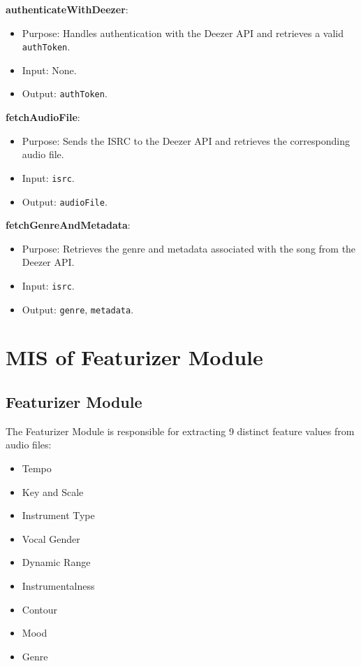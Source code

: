 \documentclass[12pt, titlepage]{article}
\begin{document}
\textbf{authenticateWithDeezer}:
\begin{itemize}
\item Purpose: Handles authentication with the Deezer API and retrieves a valid \texttt{authToken}.
\item Input: None.
\item Output: \texttt{authToken}.
\end{itemize}

\textbf{fetchAudioFile}:
\begin{itemize}
\item Purpose: Sends the ISRC to the Deezer API and retrieves the corresponding audio file.
\item Input: \texttt{isrc}.
\item Output: \texttt{audioFile}.
\end{itemize}

\textbf{fetchGenreAndMetadata}:
\begin{itemize}
\item Purpose: Retrieves the genre and metadata associated with the song from the Deezer API.
\item Input: \texttt{isrc}.
\item Output: \texttt{genre}, \texttt{metadata}.
\end{itemize}

\section{MIS of Featurizer Module}

\subsection{Featurizer Module}
The Featurizer Module is responsible for extracting 9 distinct feature values from audio files:
\begin{itemize}
    \item Tempo
    \item Key and Scale
    \item Instrument Type
    \item Vocal Gender
    \item Dynamic Range
    \item Instrumentalness
    \item Contour
    \item Mood
    \item Genre
\end{itemize}
\end{document}
